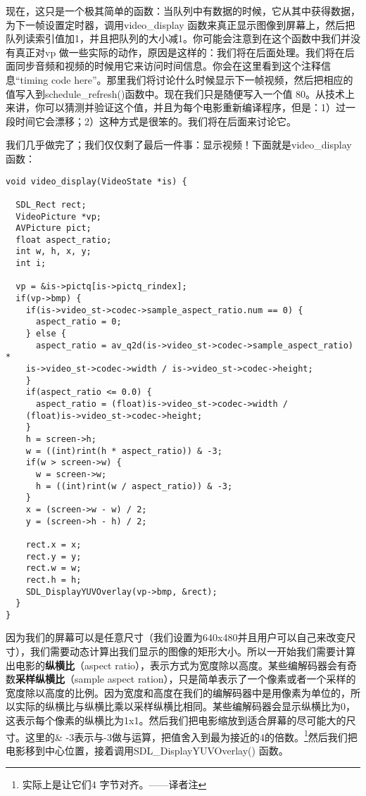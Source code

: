 现在，这只是一个极其简单的函数：当队列中有数据的时候，它从其中获得数据，为下一帧设置定时器，调用video_display 函数来真正显示图像到屏幕上，然后把队列读索引值加1，并且把队列的大小减1。你可能会注意到在这个函数中我们并没有真正对vp 做一些实际的动作，原因是这样的：我们将在后面处理。我们将在后面同步音频和视频的时候用它来访问时间信息。你会在这里看到这个注释信息“timing code here”。那里我们将讨论什么时候显示下一帧视频，然后把相应的值写入到schedule_refresh()函数中。现在我们只是随便写入一个值 80。从技术上来讲，你可以猜测并验证这个值，并且为每个电影重新编译程序，但是：1）过一段时间它会漂移；2）这种方式是很笨的。我们将在后面来讨论它。

我们几乎做完了；我们仅仅剩了最后一件事：显示视频！下面就是video_display函数：
\begin{lstlisting}
void video_display(VideoState *is) {

  SDL_Rect rect;
  VideoPicture *vp;
  AVPicture pict;
  float aspect_ratio;
  int w, h, x, y;
  int i;

  vp = &is->pictq[is->pictq_rindex];
  if(vp->bmp) {
    if(is->video_st->codec->sample_aspect_ratio.num == 0) {
      aspect_ratio = 0;
    } else {
      aspect_ratio = av_q2d(is->video_st->codec->sample_aspect_ratio) *
    is->video_st->codec->width / is->video_st->codec->height;
    }
    if(aspect_ratio <= 0.0) {
      aspect_ratio = (float)is->video_st->codec->width /
    (float)is->video_st->codec->height;
    }
    h = screen->h;
    w = ((int)rint(h * aspect_ratio)) & -3;
    if(w > screen->w) {
      w = screen->w;
      h = ((int)rint(w / aspect_ratio)) & -3;
    }
    x = (screen->w - w) / 2;
    y = (screen->h - h) / 2;

    rect.x = x;
    rect.y = y;
    rect.w = w;
    rect.h = h;
    SDL_DisplayYUVOverlay(vp->bmp, &rect);
  }
}
\end{lstlisting}

因为我们的屏幕可以是任意尺寸（我们设置为640x480并且用户可以自己来改变尺寸），我们需要动态计算出我们显示的图像的矩形大小。所以一开始我们需要计算出电影的\textbf{纵横比}（aspect ratio），表示方式为宽度除以高度。某些编解码器会有奇数\textbf{采样纵横比}（sample aspect ration），只是简单表示了一个像素或者一个采样的宽度除以高度的比例。因为宽度和高度在我们的编解码器中是用像素为单位的，所以实际的纵横比与纵横比乘以采样纵横比相同。某些编解码器会显示纵横比为0，这表示每个像素的纵横比为1x1。然后我们把电影缩放到适合屏幕的尽可能大的尺寸。这里的\& -3表示与-3做与运算，把值舍入到最为接近的4的倍数。\footnote{ 实际上是让它们4 字节对齐。——译者注}然后我们把电影移到中心位置，接着调用SDL_DisplayYUVOverlay() 函数。

